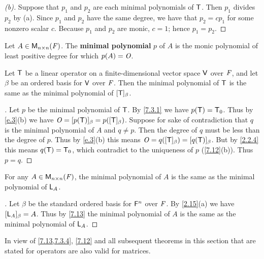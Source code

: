 \begin{proof}[(b)]
  Suppose that \(p_1\) and \(p_2\) are each minimal polynomials of \(\mathsf{T}\).
  Then \(p_1\) divides \(p_2\) by (a).
  Since \(p_1\) and \(p_2\) have the same degree, we have that \(p_2 = c p_1\) for some nonzero scalar \(c\).
  Because \(p_1\) and \(p_2\) are monic, \(c = 1\);
  hence \(p_1 = p_2\).
\end{proof}

\begin{defn}\label{7.3.3}
  Let \(A \in \ms[n][n][\F]\).
  The \textbf{minimal polynomial} \(p\) of \(A\) is the monic polynomial of least positive degree for which \(p(A) = \mathit{O}\).
\end{defn}

\begin{thm}\label{7.13}
  Let \(\mathsf{T}\) be a linear operator on a finite-dimensional vector space \(\mathsf{V}\) over \(\mathit{F}\), and let \(\beta\) be an ordered basis for \(\mathsf{V}\) over \(\mathit{F}\).
  Then the minimal polynomial of \(\mathsf{T}\) is the same as the minimal polynomial of \([\mathsf{T}]_{\beta}\).
\end{thm}

\begin{proof}[]
  Let \(p\) be the minimal polynomial of \(\mathsf{T}\).
  By \cref{7.3.1} we have \(p(\mathsf{T}) = \mathsf{T}_0\).
  Thus by \cref{e.3}(b) we have \(\mathit{O} = [p(\mathsf{T})]_{\beta} = p([\mathsf{T}]_{\beta})\).
  Suppose for sake of contradiction that \(q\) is the minimal polynomial of \(A\) and \(q \neq p\).
  Then the degree of \(q\) must be less than the degree of \(p\).
  Thus by \cref{e.3}(b) this means \(\mathit{O} = q([\mathsf{T}]_{\beta}) = [q(\mathsf{T})]_{\beta}\).
  But by \cref{2.2.4} this means \(q(\mathsf{T}) = \mathsf{T}_0\), which contradict to the uniqueness of \(p\) (\cref{7.12}(b)).
  Thus \(p = q\).
\end{proof}

\begin{cor}\label{7.3.4}
  For any \(A \in \ms[n][n][\F]\), the minimal polynomial of \(A\) is the same as the minimal polynomial of \(\mathsf{L}_A\).
\end{cor}

\begin{proof}[]
  Let \(\beta\) be the standard ordered basis for \(\mathsf{F}^n\) over \(\mathit{F}\).
  By \cref{2.15}(a) we have \([\mathsf{L}_A]_{\beta} = A\).
  Thus by \cref{7.13} the minimal polynomial of \(A\) is the same as the minimal polynomial of \(\mathsf{L}_A\).
\end{proof}

\begin{note}
  In view of \cref{7.13,7.3.4}, \cref{7.12} and all subsequent theorems in this section that are stated for operators are also valid for matrices.
\end{note}

